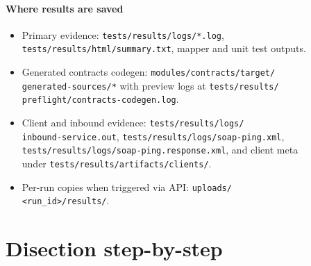 \documentclass[11pt,a4paper]{article}
\begin{document}
 \paragraph{Where results are saved}
\begin{itemize}
  \item Primary evidence: \texttt{tests/results/logs/*.log},\\
        \texttt{tests/results/html/summary.txt}, mapper and unit test outputs.
  \item Generated contracts codegen: \texttt{modules/contracts/target/\\
        generated-sources/*} with preview logs at \texttt{tests/results/\\
        preflight/contracts-codegen.log}.
  \item Client and inbound evidence: \texttt{tests/results/logs/\\
        inbound-service.out}, \texttt{tests/results/logs/soap-ping.xml},\\
        \texttt{tests/results/logs/soap-ping.response.xml}, and client meta\\
        under \texttt{tests/results/artifacts/clients/}.
  \item Per-run copies when triggered via API: \texttt{uploads/\\
        \textless run\_id\textgreater/results/}.
\end{itemize}


\section{Disection step-by-step}
\end{document}
